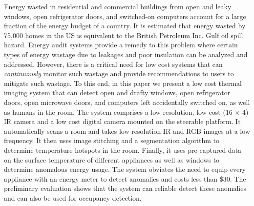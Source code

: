 Energy wasted in residential and commercial buildings from open and leaky windows, open refrigerator doors, and switched-on computers account for a large fraction of the energy budget of a country. It is estimated that energy wasted by 75,000 homes in the US is equivalent to the British Petroleum Inc. Gulf oil spill hazard. Energy audit systems provide a remedy to this problem where certain types of energy wastage due to leakages and poor insulation can be analyzed and addressed. However, there is a critical need
for low cost systems that can {\em continuously} monitor such wastage and provide recommendations to users to mitigate such wastage. To this end, in this
paper we present a low cost thermal imaging system that can detect open and drafty windows, open refrigerator doors, open microwave doors, and computers
left accidentally switched on, as well as humans in the room. The system comprises a low resolution, low cost (16 $\times$ 4) IR camera
and a low cost digital camera mounted on the steerable platform. It automatically scans a room and takes low resolution IR and RGB images at a low frequency. It then uses image stitching and a segmentation algorithm to determine temperature hotspots in the room. Finally, it uses pre-captured data on the surface temperature of different appliances as well as windows to determine anomalous energy usage. The system obviates the need to equip every appliance with an energy meter to detect anomalies and costs less than \$30. The preliminary evaluation shows that the system can reliable detect these anomalies and can also be used for occupancy detection.

